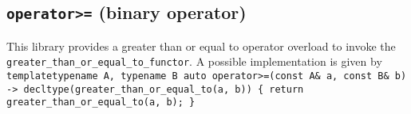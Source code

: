 \documentclass[oneside]{book}
\begin{document}
\subsection{\texttt{operator>=} (binary operator)}
This library provides a greater than or equal to operator overload to invoke the \texttt{greater\_than\_or\_equal\_to\_functor}.
A possible implementation is given by\newline
\texttt{
template\textlangle typename A, typename B\textrangle\newline
auto operator>=(const A\& a, const B\& b)\newline
-> decltype(greater\_than\_or\_equal\_to(a, b))\newline
\{ return greater\_than\_or\_equal\_to(a, b); \}
}
\end{document}

